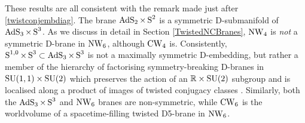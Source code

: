 These results are all consistent with the remark made just after
\eqref{twistconjembdiag}. The brane $\operatorname{AdS}_2\times\operatorname{S}^2$ is a symmetric
D-submanifold of $\operatorname{AdS}_3\times\operatorname{S}^3$. As we discuss in detail in Section
\ref{TwistedNCBranes}, $\operatorname{NW}_4$ is {\it not} a symmetric D-brane in $\operatorname{NW}_6$,
although $\operatorname{CW}_4$ is. Consistently, $\operatorname{S}^{1,0}\times\operatorname{S}^3\subset\operatorname{AdS}_3\times\operatorname{S}^3$
is not a maximally symmetric D-embedding, but rather a member of the hierarchy
of factorising symmetry-breaking D-branes in ${\rm SU}(1,1)\times{\rm SU}(2)$
which preserves the action of an ${\mathbb R}\times{\rm SU}(2)$ subgroup and is localised
along a product of images of twisted conjugacy classes \cite{Quella1}.
Similarly, both the $\operatorname{AdS}_3\times\operatorname{S}^3$ and $\operatorname{NW}_6$ branes are non-symmetric,
while $\operatorname{CW}_6$ is the worldvolume of a spacetime-filling twisted D5-brane in
$\operatorname{NW}_6$.

